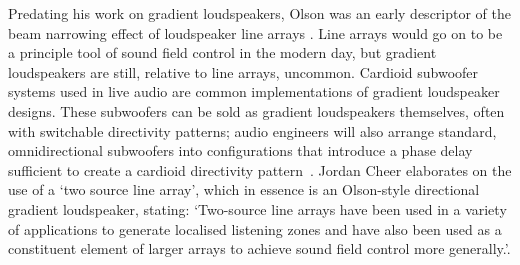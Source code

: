 \documentclass{report}
\begin{document}
        Predating his work on gradient loudspeakers, Olson was an early descriptor of the beam narrowing effect of loudspeaker line arrays \cite{olson1957acoustical}.
        Line arrays would go on to be a principle tool of sound field control in the modern day, but gradient loudspeakers are still, relative to line arrays, uncommon.
        Cardioid subwoofer systems used in live audio are common implementations of gradient loudspeaker designs.
        These subwoofers can be sold as gradient loudspeakers themselves, often with switchable directivity patterns; audio engineers will also arrange standard, omnidirectional subwoofers into configurations that introduce a phase delay sufficient to create a cardioid directivity pattern~\cite{curtis2022cardioidsubs}.
        Jordan Cheer elaborates on the use of a `two source line array', which in essence is an Olson-style directional gradient loudspeaker, stating: `Two-source line arrays have been used in a variety of applications to generate localised listening zones and have also been used as a constituent element of larger arrays to achieve sound field control more generally.'\cite{cheer2015robustness}.
\end{document}
